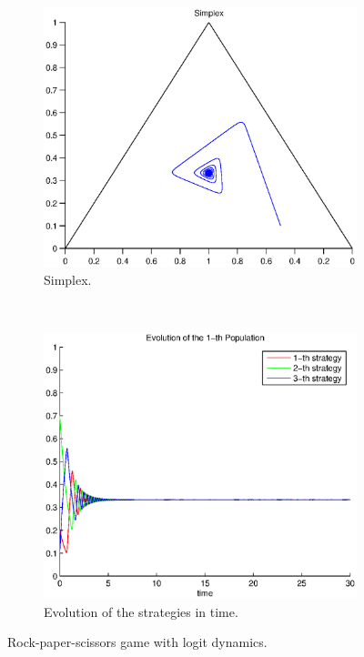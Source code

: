 \documentclass[a4paper,10pt]{article}
\begin{document}
\begin{figure}
  \centering
  \begin{subfigure}[b]{0.45\textwidth}
	  \includegraphics[width=\textwidth]{./images/test1_simplex_logit.eps}
	  \caption{Simplex.}
	  \label{fig:test1_simplex_logit}
  \end{subfigure}
  ~ 
  \begin{subfigure}[b]{0.45\textwidth}
	  \includegraphics[width=\textwidth]{./images/test1_ev_logit.eps}
	  \caption{Evolution of the strategies in time.}
	  \label{fig:test1_ev_logit}
  \end{subfigure}
  \caption{Rock-paper-scissors game with logit dynamics.}
  \label{fig:rpc_game_logit}
\end{figure}
\end{document}

